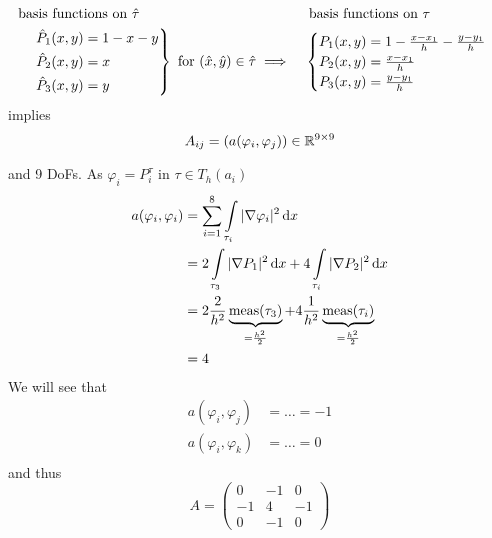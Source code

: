 \begin{example}
	\begin{align*}
		&\text{basis functions on } \hat{\tau} & &   \text{ basis functions on } \tau\\
		&\begin{rcases}
		&\hat{P}_1(x,y)=1-x-y \\
		&\hat{P}_2(x,y)=x \\
		&\hat{P}_3(x,y)=y \\
		\end{rcases}  \text{ for } (\hat{x},\hat{y}) \in \hat{\tau} \implies &&
		\begin{cases}
		P_1(x,y) = 1- \frac{x-x_1}{h} - \frac{y-y_1}{h} \\
		P_2(x,y) = \frac{x-x_1}{h} \\
		P_3(x,y) = \frac{y-y_1}{h} \\
		\end{cases}
	\end{align*}
	implies 
	\begin{equation*}
		A_{ij} =(a(\varphi_i, \varphi_j)) \in \mathbb{R}^{9 \times 9} 
	\end{equation*}
	
	
	
	and 9 DoFs. As $\varphi_i = P^\tau_i$ in $\tau \in T_h(a_i)$
	\begin{align*}
		a(\varphi_i, \varphi_i) &= \displaystyle \sum^8_{i=1} \int \limits_{\tau_i} |\nabla \varphi_i|^2 \mathop{}\!\mathrm{d} x\\
		&= 2 \int \limits_{\tau_3 } |\nabla P_1|^2 \mathop{}\!\mathrm{d} x + 4 \int \limits_{\tau_i} |\nabla P_2|^2 \mathop{}\!\mathrm{d} x\\
		&= 2 \frac{2}{h^2} \underbrace{\text{meas}(\tau_3)}_{=\frac{h^2}{2}}  +4 \frac{1}{h^2} \underbrace{\text{meas}(\tau_i)}_{=\frac{h^2}{2}}\\
		&=4
	\end{align*}
	 We will see that
	 \begin{align*}
	 	a(\varphi_i,\varphi_j) &= \dots = -1\\
	 	a(\varphi_i,\varphi_k) &= \dots = 0\\
	 \end{align*}
	 and thus 
	 \begin{equation*}
	 	A = \begin{pmatrix}
	 	0&-1&0\\
	 	-1&4&-1\\
	 	0&-1&0
	 	\end{pmatrix}
	 \end{equation*}
	
\end{example}
